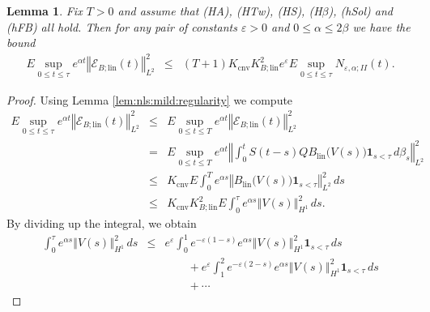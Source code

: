 \documentclass[10pt]{articleHJ}
\newcommand{\e}{\ensuremath{\varepsilon}}
\renewcommand{\a}{\ensuremath{\alpha}}
\newcommand{\norm}[1]{\left\Vert#1\right\Vert}		%
\newtheorem{lem}[thm]{Lemma}
\numberwithin{equation}{section}
\begin{document}
\begin{lem}
\label{lem:nls:b:lin:sup:e}
Fix $T > 0$ and assume that (HA), (HTw), (HS),
(H$\beta$),
(hSol) and (hFB) all hold.
Then for any pair of constants
$\e > 0$
and $0 \le \alpha \le 2 \beta$ we have the bound
\begin{equation}
\begin{array}{lcl}
E \sup_{0 \le t \le \tau} e^{\alpha t } \norm{\mathcal{E}_{B;\mathrm{lin}}(t )}_{L^2}^2
 & \le &  (T + 1)  K_{\mathrm{cnv}} K_{B;\mathrm{lin}}^2 e^{\e}
   E \sup_{0 \le t \le \tau}   N_{\e,\a;II}(t) .
\end{array}
\end{equation}
\end{lem}
\begin{proof}
Using Lemma \ref{lem:nls:mild:regularity}
we compute
\begin{equation}
\label{eq:nls:bnd:on:e:b:lin:dir:from:mild:fmr}
\begin{array}{lcl}
E \sup_{0 \le t \le \tau} e^{\alpha t } \norm{\mathcal{E}_{B;\mathrm{lin}}(t )}_{L^2}^2
  & \le   &
  E \sup_{0 \le t \le T} e^{\alpha t } \norm{\mathcal{E}_{B;\mathrm{lin}}(t )}_{L^2}^2
\\[0.2cm]
& = &
    E \sup_{0 \le t \le T} e^{\alpha t }
      \norm{ \int_0^{t} S(t-s) Q B_{\mathrm{lin}}\big(V(s)\big)
        \mathbf{1}_{s < \tau} \, d \beta_s
       }_{L^2}^2
\\[0.2cm]
& \le &
  K_{\mathrm{cnv}} E
      \int_{0}^T
        e^{ \alpha s}
        \norm{
           B_{\mathrm{lin}}\big(V(s)\big)
            \mathbf{1}_{s < \tau}
         }_{L^2}^2 \, ds
\\[0.2cm]
& \le &
  K_{\mathrm{cnv}} K_{B;\mathrm{lin}}^2
  E \int_0^\tau
      e^{ \alpha s} \norm{V(s)}_{H^1}^2 \, ds .
\end{array}
\end{equation}
By dividing up the integral, we obtain
\begin{equation}
\begin{array}{lcl}
\int_0^\tau
      e^{ \alpha s} \norm{V(s)}_{H^1}^2 \, ds
& \le &
    e^{\e} \int_0^{1 }
     e^{ -\e(1 - s) } e^{ \alpha s}
       \norm{V(s)}_{H^1}^2 \mathbf{1}_{s < \tau}  \, ds
\\[0.2cm]
& & \qquad
  +
     e^{\e} \int_1^{2 }
        e^{ -\e(2 - s) } e^{ \alpha s}
        \norm{V(s)}_{H^1}^2 \mathbf{1}_{s < \tau}  \, ds
\\[0.2cm]
& & \qquad
  + \cdots

\end{array}
\end{equation}
\end{proof}
\end{document}
